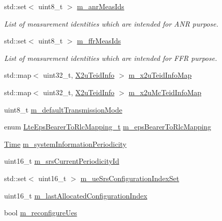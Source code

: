 \begin{DoxyCompactItemize}
std\+::set$<$ uint8\+\_\+t $>$ \hyperlink{classns3_1_1LteEnbRrc_a2a7403d83c681878a4e5acbc9170aa8f}{m\+\_\+anr\+Meas\+Ids}
\begin{DoxyCompactList}\small\item\em List of measurement identities which are intended for A\+NR purpose. \end{DoxyCompactList}\item 
std\+::set$<$ uint8\+\_\+t $>$ \hyperlink{classns3_1_1LteEnbRrc_a20814939a7e5b4152f041af937b4516d}{m\+\_\+ffr\+Meas\+Ids}
\begin{DoxyCompactList}\small\item\em List of measurement identities which are intended for F\+FR purpose. \end{DoxyCompactList}\item 
std\+::map$<$ uint32\+\_\+t, \hyperlink{structns3_1_1LteEnbRrc_1_1X2uTeidInfo}{X2u\+Teid\+Info} $>$ \hyperlink{classns3_1_1LteEnbRrc_acf64b26e133b693531c511792656cf81}{m\+\_\+x2u\+Teid\+Info\+Map}
\item 
std\+::map$<$ uint32\+\_\+t, \hyperlink{structns3_1_1LteEnbRrc_1_1X2uTeidInfo}{X2u\+Teid\+Info} $>$ \hyperlink{classns3_1_1LteEnbRrc_a2e6d93354aecf82495a39fa06c33b558}{m\+\_\+x2u\+Mc\+Teid\+Info\+Map}
\item 
uint8\+\_\+t \hyperlink{classns3_1_1LteEnbRrc_a5f1177a52d92540603594fbabb882a1d}{m\+\_\+default\+Transmission\+Mode}
\item 
enum \hyperlink{classns3_1_1LteEnbRrc_a1c748bf2d69860b866dfda2a38427842}{Lte\+Eps\+Bearer\+To\+Rlc\+Mapping\+\_\+t} \hyperlink{classns3_1_1LteEnbRrc_ad90d6c8a5ef8ee123ba68498cc20df5c}{m\+\_\+eps\+Bearer\+To\+Rlc\+Mapping}
\item 
\hyperlink{classns3_1_1Time}{Time} \hyperlink{classns3_1_1LteEnbRrc_a9f7be69996d0a982b8ae5129c0c3b1af}{m\+\_\+system\+Information\+Periodicity}
\item 
uint16\+\_\+t \hyperlink{classns3_1_1LteEnbRrc_abf0c77f8f27fff5a4e00608a6c822a8b}{m\+\_\+srs\+Current\+Periodicity\+Id}
\item 
std\+::set$<$ uint16\+\_\+t $>$ \hyperlink{classns3_1_1LteEnbRrc_a1807b21ca2e25c55dcbea00ca8657aaa}{m\+\_\+ue\+Srs\+Configuration\+Index\+Set}
\item 
uint16\+\_\+t \hyperlink{classns3_1_1LteEnbRrc_a9454a84fa173baf091a7ca00d0b85716}{m\+\_\+last\+Allocated\+Configuration\+Index}
\item 
bool \hyperlink{classns3_1_1LteEnbRrc_ae7db42291c9eae0a693615ad5cb94baf}{m\+\_\+reconfigure\+Ues}
\item 

\end{DoxyCompactItemize}
